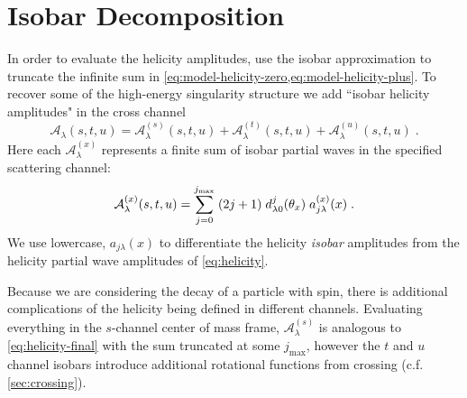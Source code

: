 \section{Isobar Decomposition} \label{sec:isobar-decomp}
In order to evaluate the helicity amplitudes, use the isobar approximation to truncate the infinite sum in \cref{eq:model-helicity-zero,eq:model-helicity-plus}. To recover some of the high-energy singularity structure we add ``isobar helicity amplitudes" in the cross channel
  \begin{equation}
    \label{eq:isobar-def}
    \mathcal{A}_\lambda(s,t,u) = \mathcal{A}_\lambda^{(s)}(s,t,u) +  \mathcal{A}_\lambda^{(t)}(s,t,u) + \mathcal{A}_\lambda^{(u)}(s,t,u) \; .
  \end{equation}
Here each \(\mathcal{A}_\lambda^{(x)}\) represents a finite sum of isobar partial waves in the specified scattering channel:
  \begin{equation}
    \mathcal{A}_\lambda^{(x)}(s,t,u) = \sum_{j = 0}^{j_\text{max}} \; (2j+1) \; d_{\lambda0}^j(\theta_x) \; a^{(x)}_{j\lambda}(x) \; .
  \end{equation}
We use lowercase, \(a_{j\lambda}(x)\) to differentiate the helicity \textit{isobar} amplitudes from the helicity partial wave amplitudes of \cref{eq:helicity}.

 Because we are considering the decay of a particle with spin, there is additional complications of the helicity being defined in different channels. Evaluating everything in the \(s\)-channel center of mass frame, \(\mathcal{A}_\lambda^{(s)}\) is analogous  to \cref{eq:helicity-final} with the sum truncated at some \(j_\text{max}\), however the \(t\) and \(u\) channel isobars introduce additional rotational functions from crossing (c.f. \cref{sec:crossing}).

